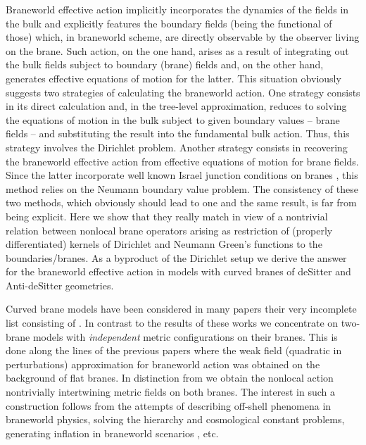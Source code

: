\documentclass[a4paper,12pt]{article}
\begin{document}
Braneworld effective action implicitly incorporates the dynamics
of the fields in the bulk and explicitly features the boundary
fields (being the functional of those) which, in braneworld
scheme, are directly observable by the observer living on the
brane. Such action, on the one hand, arises as a result of
integrating out the bulk fields subject to boundary (brane) fields
and, on the other hand, generates effective equations of motion
for the latter. This situation obviously suggests two strategies
of calculating the braneworld action. One strategy consists in its
direct calculation and, in the tree-level approximation, reduces
to solving the equations of motion in the bulk subject to given
boundary values -- brane fields -- and substituting the result
into the fundamental bulk action. Thus, this strategy involves the
Dirichlet problem. Another strategy consists in recovering the
braneworld effective action from effective equations of motion for
brane fields. Since the latter incorporate well known Israel
junction conditions on branes \cite{Israel}, this method relies on
the Neumann boundary value problem. The consistency of these two
methods, which obviously should lead to one and the same result,
is far from being explicit. Here we show that they really match in
view of a nontrivial relation between nonlocal brane operators
arising as restriction of (properly differentiated) kernels of
Dirichlet and Neumann Green's functions to the boundaries/branes.
As a byproduct of the Dirichlet setup we derive the answer for the
braneworld effective action in models with curved branes of
deSitter and Anti-deSitter geometries.

Curved brane models have been considered in many papers their very
incomplete list consisting of
\cite{GarSas,Reall,HHR,ParikhSol,GenSas,GarPujTan}. In contrast to
the results of these works we concentrate on two-brane models with
{\em independent} metric configurations on their branes. This is
done along the lines of the previous papers \cite{brane,BWEA}
where the weak field (quadratic in perturbations) approximation
for braneworld action was obtained on the background of flat
branes. In distinction from \cite{HHR,GenSas,GarPujTan} we obtain
the nonlocal action nontrivially intertwining metric fields on
both branes. The interest in such a construction follows from the
attempts of describing off-shell phenomena in braneworld physics,
solving the hierarchy and cosmological constant problems,
generating inflation in braneworld scenarios \cite{Tye,brane},
etc.
\end{document}
